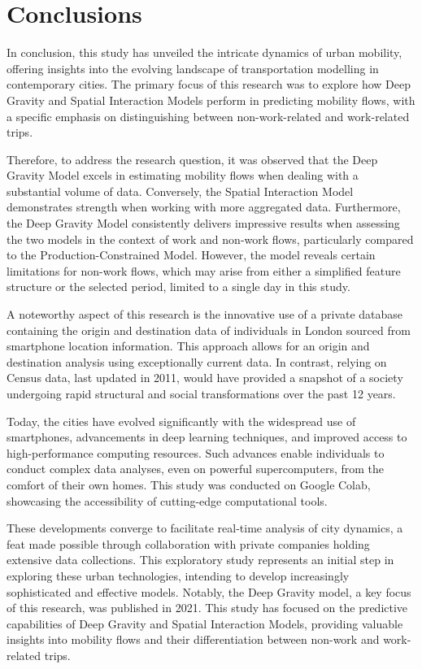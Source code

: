 \chapter{Conclusions}
\label{chapterlabel4}

In conclusion, this study has unveiled the intricate dynamics of urban mobility, offering insights into the evolving landscape of transportation modelling in contemporary cities. The primary focus of this research was to explore how Deep Gravity and Spatial Interaction Models perform in predicting mobility flows, with a specific emphasis on distinguishing between non-work-related and work-related trips.

Therefore, to address the research question, it was observed that the Deep Gravity Model excels in estimating mobility flows when dealing with a substantial volume of data. Conversely, the Spatial Interaction Model demonstrates strength when working with more aggregated data. Furthermore, the Deep Gravity Model consistently delivers impressive results when assessing the two models in the context of work and non-work flows, particularly compared to the Production-Constrained Model. However, the model reveals certain limitations for non-work flows, which may arise from either a simplified feature structure or the selected period, limited to a single day in this study.

A noteworthy aspect of this research is the innovative use of a private database containing the origin and destination data of individuals in London sourced from smartphone location information. This approach allows for an origin and destination analysis using exceptionally current data. In contrast, relying on Census data, last updated in 2011, would have provided a snapshot of a society undergoing rapid structural and social transformations over the past 12 years.

Today, the cities have evolved significantly with the widespread use of smartphones, advancements in deep learning techniques, and improved access to high-performance computing resources. Such advances enable individuals to conduct complex data analyses, even on powerful supercomputers, from the comfort of their own homes. This study was conducted on Google Colab, showcasing the accessibility of cutting-edge computational tools.

These developments converge to facilitate real-time analysis of city dynamics, a feat made possible through collaboration with private companies holding extensive data collections. This exploratory study represents an initial step in exploring these urban technologies, intending to develop increasingly sophisticated and effective models. Notably, the Deep Gravity model, a key focus of this research, was published in 2021. This study has focused on the predictive capabilities of Deep Gravity and Spatial Interaction Models, providing valuable insights into mobility flows and their differentiation between non-work and work-related trips.


